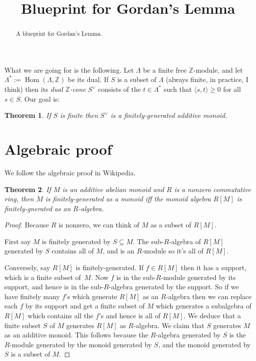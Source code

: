 \documentclass[english]{amsart}
\newcommand{\Z}{\mathbb{Z}}
\DeclareMathOperator{\Hom}{Hom}
\newtheorem{theorem}{Theorem}
\begin{document}
\title[]{Blueprint for Gordan's Lemma}

\begin{abstract}
A blueprint for Gordan's Lemma.
\end{abstract}

\maketitle

What we are going for is the following. Let $\Lambda$ be a finite free $\Z$-module, and let $\Lambda^*:=\Hom(\Lambda,\Z)$ be its dual. If $S$ is a subset of $\Lambda$ (always finite, in practice, I think) then its \emph{dual $\Z$-cone} $S^\vee$ consists of the $t\in\Lambda^*$ such that $\langle s,t\rangle\geq0$ for all $s\in S$. Our goal is:

\begin{theorem}If $S$ is finite then $S^\vee$ is a finitely-generated additive monoid.
\end{theorem}

\section{Algebraic proof}

We follow the algebraic proof in Wikipedia.

\begin{theorem} If $M$ is an additive abelian monoid and $R$ is a nonzero commutative ring, then $M$ is finitely-generated as a monoid iff the monoid algebra $R[M]$ is finitely-gnerated as an $R$-algebra.
\end{theorem}
\begin{proof} Because $R$ is nonzero, we can think of $M$ as a subset of $R[M]$.
  
  First say $M$ is finitely generated by $S\subseteq M$. The sub-$R$-algebra of $R[M]$ generated by $S$ contains all of $M$, and is an $R$-module so it's all of $R[M]$.

  Conversely, say $R[M]$ is finitely-generated. If $f\in R[M]$ then it has a support, which is a finite subset of~$M$. Now $f$ is in the sub-$R$-module generated by its support, and hence is in the sub-$R$-algebra generated by the support. So if we have finitely many $f$'s which generate $R[M]$ as an $R$-algebra then we can replace each $f$ by its support and get a finite subset of $M$ which generates a subalgebra of $R[M]$ which contains all the $f$'s and hence is all of $R[M]$. We deduce that a finite subset $S$ of $M$ generates $R[M]$ as $R$-algebra. We claim that $S$ generates $M$ as an additive monoid. This follows because the $R$-algebra generated by $S$ is the $R$-module generated by the monoid generated by $S$, and the monoid generated by $S$ is a subset of $M$.
\end{proof}
\end{document}
